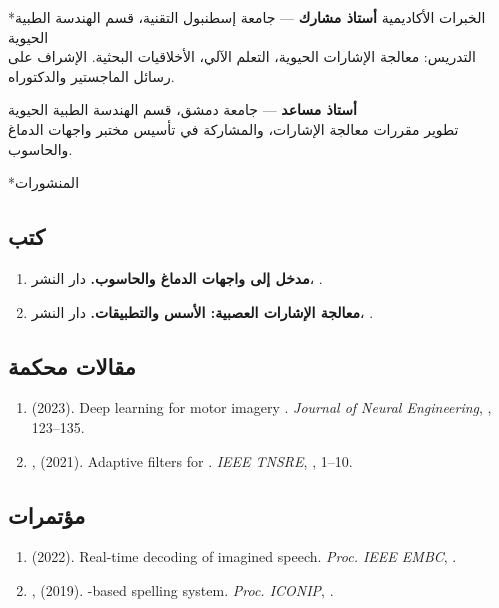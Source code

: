 \documentclass[11pt,a4paper]{article}
\makeatletter
\let\oldsection\section
\renewcommand{\section}{\@ifstar{\sectionstar}{\oldsection}}
\newcommand{\sectionstar}[1]{\oldsection*{#1}\vspace{-0.6em}{\color{rule}\hrule height 0.4pt}\vspace{0.4em}}
\makeatother
\begin{document}
\section*{الخبرات الأكاديمية}
\textbf{أستاذ مشارك} — جامعة إسطنبول التقنية، قسم الهندسة الطبية الحيوية \hfill {}\\
التدريس: معالجة الإشارات الحيوية، التعلم الآلي، الأخلاقيات البحثية. الإشراف على
رسائل الماجستير والدكتوراه.
\vspace{0.5em}

\textbf{أستاذ مساعد} — جامعة دمشق، قسم الهندسة الطبية الحيوية \hfill {}\\
تطوير مقررات معالجة الإشارات، والمشاركة في تأسيس مختبر واجهات الدماغ والحاسوب.

\section*{المنشورات}

\subsection*{كتب}
\begin{enumerate}
\item \textbf{مدخل إلى واجهات الدماغ والحاسوب.} دار النشر، .
\item \textbf{معالجة الإشارات العصبية: الأسس والتطبيقات.} دار النشر، .
\end{enumerate}

\subsection*{مقالات محكمة}
\begin{enumerate}
\item {} (2023). Deep learning for motor imagery . \emph{Journal of Neural Engineering}, , 123--135.
\item {},  (2021). Adaptive filters for . \emph{IEEE TNSRE}, , 1--10.
\end{enumerate}

\subsection*{مؤتمرات}
\begin{enumerate}
\item {} (2022). Real-time decoding of imagined speech. \emph{Proc. IEEE EMBC}, .
\item {},  (2019). -based spelling system. \emph{Proc. ICONIP}, .
\end{enumerate}
\end{document}
